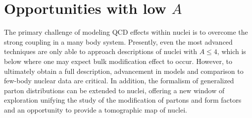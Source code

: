 \section{Opportunities with low $A$}

The primary challenge of modeling QCD effects within nuclei is to overcome
the strong coupling in a many body system.  Presently, even the most advanced
techniques are only able to approach descriptions of nuclei with $A \le 4$, 
which is below where one may expect bulk modification effect to occur.  However,
to ultimately obtain a full description, advancement in models and comparison
to few-body nuclear data are critical.  In addition, the formalism of generalized
parton distributions can be extended to nuclei,  offering a new window of 
exploration unifying the study of the modification of partons and form factors
and an opportunity to provide a tomographic map of nuclei.

